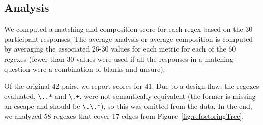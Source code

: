 \subsection{Analysis}
We computed a matching and composition score for each regex based on the 30 participant responses.
The average analysis or average composition is computed by averaging the associated 26-30 values for each metric for each of the 60 regexes (fewer than 30 values were used if all the responses in a matching question were a combination of blanks and unsure). %


Of the original 42 pairs, we report scores for 41. Due to a design flaw, the regexes evaluated, \verb!\..*! and \verb!\.+!. were not semantically equivalent (the former is missing an escape and should be \verb!\.\.*!), so this was omitted from the data. In the end, we analyzed 58 regexes that cover 17 edges from Figure~\ref{fig:refactoringTree}.

